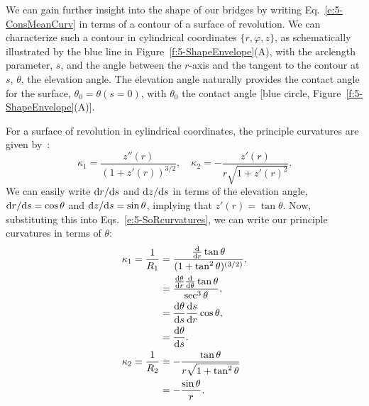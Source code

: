 We can gain further insight into the shape of our bridges by writing Eq.~\ref{e:5-ConsMeanCurv} in terms of a contour of a surface of revolution.
We can characterize such a contour in cylindrical coordinates $\{r,\varphi, z\}$, as schematically illustrated by the blue line in Figure~\ref{f:5-ShapeEnvelope}(A), with the arclength parameter, $s$, and the angle between the $r$-axis and the tangent to the contour at $s$,  $\theta$, the elevation angle.
The elevation angle naturally provides the contact angle for the surface, $\theta_0 = \theta(s=0)$, with $\theta_0$ the contact angle [blue circle, Figure~\ref{f:5-ShapeEnvelope}(A)].

For a surface of revolution in cylindrical coordinates, the principle curvatures are given by~\cite{RN35}:
\begin{equation}
  \kappa_1 = \frac{z''(r)}{(1+z'(r))^{3/2}}, \quad \kappa_2 = -\frac{z'(r)}{r\sqrt{1 + z'(r)^2}}.\label{e:5-SoRcurvatures}
\end{equation}
We can easily write ${\rm d}r/{\rm d}s$ and ${\rm d}z/{\rm d}s$ in terms of the elevation angle, ${\rm d}r/{\rm d}s = \cos \theta$ and ${\rm d}z/{\rm d}s = \sin \theta$, implying that $z'(r) = \tan \theta$.
Now, substituting this into Eqs.~\ref{e:5-SoRcurvatures}, we can write our principle curvatures in terms of $\theta$:
\begin{align}
  \kappa_1 = \frac{1}{R_1} &= \frac{\frac{\rm d}{{\rm d}r} \tan \theta}{(1 + \tan ^2 \theta)^{(3/2)}}, \\
           &= \frac{\frac{{\rm d}\theta}{{\rm d}r} \frac{\rm d}{{\rm d}\theta} \tan \theta}{\sec^3 \theta}, \\
           &= \frac{{\rm d}\theta}{{\rm d}s} \frac{{\rm d}s}{{\rm d}r} \cos \theta, \\
           &= \frac{{\rm d}\theta}{{\rm d}s}.\label{e:5-kappa1} \\
  \kappa_2 = \frac{1}{R_2} & = -\frac{\tan\theta}{r \sqrt{1 + \tan^2\theta}} \\
           &= -\frac{\sin \theta}{r}.\label{e:5-kappa2}
\end{align}

